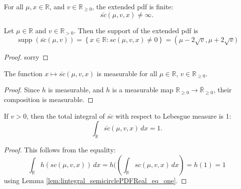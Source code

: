 \begin{lemma}
  \leanok
  \label{lem:semicirclePDF_ne_top}
  For all \( \mu, x \in \mathbb{R} \), and \( v \in \mathbb{R}_{\ge 0} \), the extended pdf is finite:
  \[
    \bar{sc}(\mu,v,x) \ne \infty.
  \]
\end{lemma}

\begin{lemma}
  \leanok
  \label{lem:support_semicirclePDF}
  Let \( \mu \in \mathbb{R} \) and \( v \in \mathbb{R}_{> 0} \). Then the support of the extended pdf is
  \[
      \operatorname{supp}(\bar{sc}(\mu,v)) = \left\{ x \in \mathbb{R} : sc(\mu,v,x) \ne 0 \right\}
    = \left(\mu - 2\sqrt{v}, \mu + 2\sqrt{v})\right.
  \]
\end{lemma}
\begin{proof}
    sorry
\end{proof}

\begin{lemma}
  \leanok
  \label{lem:measurable_semicirclePDF}
  The function \( x \mapsto \bar{sc}(\mu,v,x) \) is measurable for all \( \mu \in \mathbb{R} \), \( v \in \mathbb{R}_{\ge 0} \).
\end{lemma}
\begin{proof}
  Since $h$ is measurable, and $h$ is a measurable map \( \mathbb{R}_{\ge 0} \to \overline{\mathbb{R}}_{\ge 0} \), their composition is measurable.
\end{proof}

\begin{lemma}
  \leanok
  \label{lem:lintegral_semicirclePDF_eq_one}
  If $v > 0$, then the total integral of $\bar{sc}$ with respect to Lebesgue measure is 1:
  \[
      \int_{\mathbb{R}} \bar{sc}(\mu,v,x) \, dx = 1.
  \]
\end{lemma}
\begin{proof}
  This follows from the equality:
  \[
  \int_{\mathbb{R}} h(sc(\mu,v,x)) \, dx = h( \left( \int_{\mathbb{R}} sc(\mu,v,x) \, dx \right) = h(1) = 1
  \]
  using Lemma \ref{lem:lintegral_semicirclePDFReal_eq_one}.
\end{proof}




